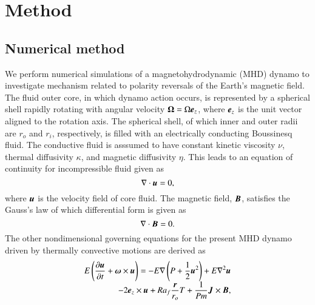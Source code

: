 \section{Method}
\label{section:method}

\subsection{Numerical method}

We perform numerical simulations of a magnetohydrodynamic (MHD) dynamo to investigate  mechanism related to polarity reversals of the Earth's magnetic field.
The fluid outer core, in which dynamo action occurs, is represented by a spherical shell rapidly rotating with angular velocity ${\bf \Omega} = \Omega \mbox{\boldmath$e$}_z$, where $\mbox{\boldmath$e$}_z$ is the unit vector aligned to the rotation axis.
The spherical shell, of which inner and outer radii are $r_o$ and $r_i$, respectively, is filled with an electrically conducting Boussinesq fluid. 
{\color{green}
The conductive fluid is asssumed to have constant kinetic viscosity $\nu$, thermal diffusivity $\kappa$, and magnetic diffusivity $\eta$.
}
This leads to an equation of continuity for incompressible fluid given as
%
\begin{equation}
\nabla \cdot \mbox{\boldmath$u$} = 0,
\label{eq:divu=0}
\end{equation}
%
where $\mbox{\boldmath$u$}$ is the velocity field of core fluid.
The magnetic field, $\mbox{\boldmath$B$}$, satisfies the Gauss's law of which differential form is given as
%
\begin{equation}
\nabla \cdot \mbox{\boldmath$B$} = 0.
\label{eq:divB=0}
\end{equation}
%
The other nondimensional governing equations for the present MHD dynamo driven by thermally convective motions are derived as
%
\begin{equation}
\begin{array}{l}
\displaystyle
E \left( \frac{\partial\bvec{u}}{\partial t} +
 \bvec{\omega} \times \bvec{u} \right) =
 - E \nabla \left( P + \frac{1}{2} \bvec{u}^2 \right)
 + E \nabla^2 \bvec{u}
\\
\displaystyle
\hspace*{\fill}
 -2 \bvec{e}_z \times \bvec{u}
 + Ra_f \frac{\bvec{r}}{r_o} T
 + \frac{1}{Pm} \bvec{J} \times \bvec{B} ,
\end{array}
\label{eq:momentum}
\end{equation}
